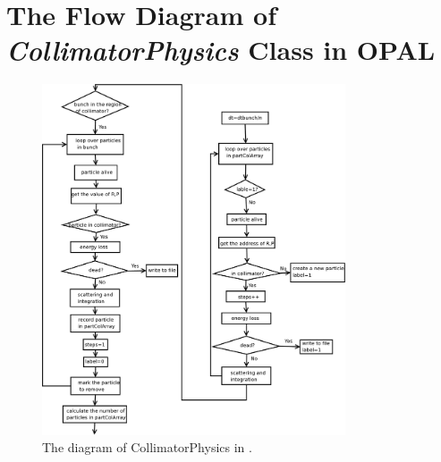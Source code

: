 \section{The Flow Diagram of {\em CollimatorPhysics} Class in OPAL}
\begin{figure}[ht!]
\begin{center}
\includegraphics[width=0.8\textwidth]{figures/partmatter/diagram}
\end{center}
\caption{The diagram of CollimatorPhysics in \opal. }
\label{fig:diagram}
\end{figure}
